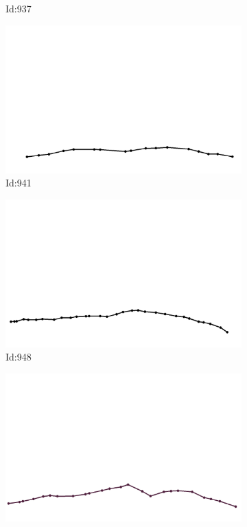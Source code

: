 \documentclass[12pt,twoside]{report}
\begin{document}
\begin{figure}
\begin{subfigure}[b]{0.20\textwidth}
\caption{Id:937}
\end{subfigure}
\begin{subfigure}[b]{0.20\textwidth}
\centering
\includegraphics[width=\textwidth]{../trajectories/941.png}
\caption{Id:941}
\end{subfigure}
\begin{subfigure}[b]{0.20\textwidth}
\centering
\includegraphics[width=\textwidth]{../trajectories/948.png}
\caption{Id:948}
\end{subfigure}
\begin{subfigure}[b]{0.20\textwidth}
\centering
\includegraphics[width=\textwidth]{../trajectories/949.png}

\end{subfigure}
\end{figure}
\end{document}
